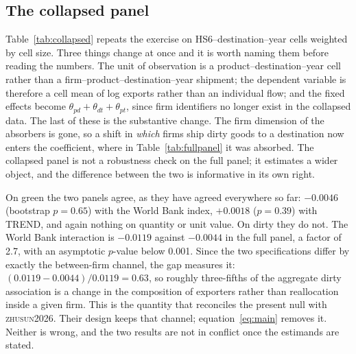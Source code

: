 \documentclass[11pt]{article}
\newcommand{\citet}[1]{\textsc{#1}}
\begin{document}




\FloatBarrier
\subsection{The collapsed panel}\label{sec:collapsed}

Table~\ref{tab:collapsed} repeats the exercise on HS6--destination--year cells weighted by cell size.
Three things change at once and it is worth naming them before reading the numbers. The unit of
observation is a product--destination--year cell rather than a firm--product--destination--year
shipment; the dependent variable is therefore a cell mean of log exports rather than an individual
flow; and the fixed effects become $\theta_{pd} + \theta_{dt} + \theta_{pt}$, since firm identifiers
no longer exist in the collapsed data. The last of these is the substantive change. The firm dimension
of the absorbers is gone, so a shift in \emph{which} firms ship dirty goods to a destination now enters
the coefficient, where in Table~\ref{tab:fullpanel} it was absorbed. The collapsed panel is not a
robustness check on the full panel; it estimates a wider object, and the difference between the two is
informative in its own right.

On green the two panels agree, as they have agreed everywhere so far: $-0.0046$ (bootstrap $p =
0.65$) with the World Bank index, $+0.0018$ ($p = 0.39$) with TREND, and again nothing on quantity or
unit value. On dirty they do not. The World Bank interaction is $-0.0119$ against $-0.0044$ in the
full panel, a factor of 2.7, with an asymptotic $p$-value below 0.001. Since the two specifications
differ by exactly the between-firm channel, the gap measures it: $(0.0119 - 0.0044)/0.0119 = 0.63$, so
roughly three-fifths of the aggregate dirty association is a change in the composition of exporters
rather than reallocation inside a given firm. This is the quantity that reconciles the present null
with \citet{zhusun2026}. Their design keeps that channel; equation~\eqref{eq:main} removes it. Neither
is wrong, and the two results are not in conflict once the estimands are stated.
\end{document}
